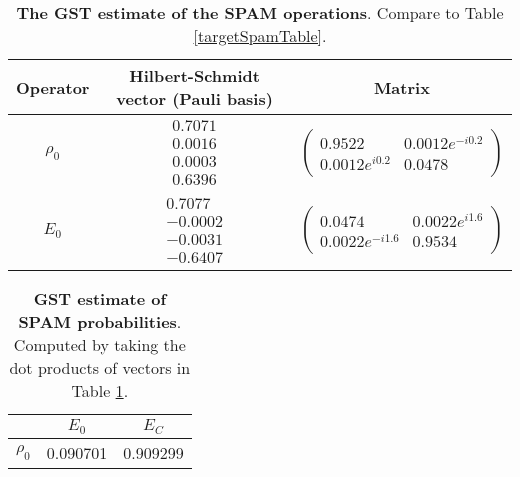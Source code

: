 {\begin{table}[h]
\begin{center}
\begin{tabular}[l]{|c|c|c|}
\hline
Operator & Hilbert-Schmidt vector (Pauli basis) & Matrix \\ \hline
$\rho_{0}$ & $ \begin{array}{c}
0.7071 \\ 
0.0016 \\ 
0.0003 \\ 
0.6396
 \end{array} $
 & $ \left(\!\!\begin{array}{cc}
0.9522 & 0.0012e^{-i0.2} \\ 
0.0012e^{i0.2} & 0.0478
 \end{array}\!\!\right) $
 \\ \hline
$E_{0}$ & $ \begin{array}{c}
0.7077 \\ 
-0.0002 \\ 
-0.0031 \\ 
-0.6407
 \end{array} $
 & $ \left(\!\!\begin{array}{cc}
0.0474 & 0.0022e^{i1.6} \\ 
0.0022e^{-i1.6} & 0.9534
 \end{array}\!\!\right) $
 \\ \hline
\end{tabular}

\caption{\textbf{The GST estimate of the SPAM operations}.  Compare to Table \ref{targetSpamTable}.\label{bestCPTPGatesetSpamTable}}
\end{center}
\end{table}

\begin{table}[h]
\begin{center}
\begin{tabular}[l]{|c|c|c|}
\hline
 & $E_{0}$ & $E_C$ \\ \hline
$\rho_{0}$ & 0.090701 & 0.909299 \\ \hline
\end{tabular}

\caption{\textbf{GST estimate of SPAM probabilities}.  Computed by taking the dot products of vectors in Table \ref{bestCPTPGatesetSpamTable}.\label{bestCPTPGatesetSpamParametersTable}}
\end{center}
\end{table}

}
